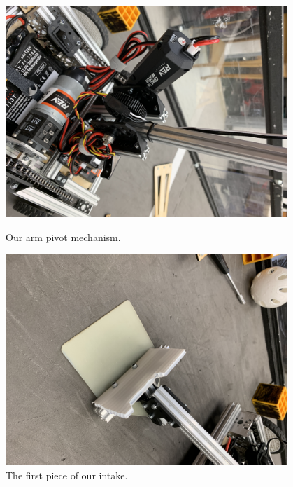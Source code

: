 \begin{figure}[ht]
\centering
\begin{minipage}[b]{.48\textwidth}
  \centering
  \includegraphics[width=0.95\textwidth]{Meetings/October/10-07-21/10-7-21_Hardware_Figure3 - Nathan Forrer.JPG}
  \caption{Our arm pivot mechanism.}
  \label{fig:100721_3}
\end{minipage}%
\hfill%
\begin{minipage}[b]{.48\textwidth}
  \centering
  \includegraphics[width=0.95\textwidth]{Meetings/October/10-07-21/10-7-21_Hardware_Figure4 - Nathan Forrer.JPG}
  \caption{The first piece of our intake.}
  \label{fig:100721_4}
\end{minipage}
\end{figure}



